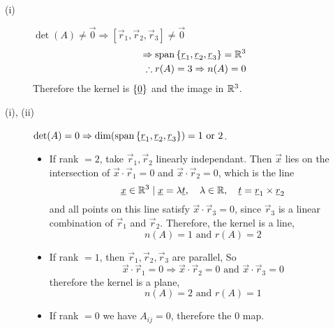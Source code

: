 \documentclass{article}
\numberwithin{equation}{section}
\begin{document}
\begin{description}
    \item[(i)] $\det(A) \neq \vec 0 \Rightarrow [\vec r_1, \vec r_2, \vec r_3] \neq \vec 0$
    \begin{align*}
        \Rightarrow \operatorname{span} \left\{ \underline{r}_1, \underline{r}_2, \underline{r}_3 \right\} = \mathbb{R}^3 \\
        \therefore r(A) = 3 \Rightarrow n(A) = 0
    \end{align*}
    Therefore the kernel is $\left\{ \underline{0} \right\}$ and the image in $\mathbb{R}^3$.

    \item[(i), (ii)] $\det(A) = 0 \Rightarrow \dim(\operatorname{span} \left\{ \underline{r}_1, \underline{r}_2, \underline{r}_3 \right\}) = 1 \text{ or } 2$.
    \begin{itemize}
        \item If rank $=2$, take $\vec r_1, \vec r_2$ linearly independant. 
        Then $\vec x$ lies on the intersection of $\vec x \cdot \vec r_1 = 0$ and $\vec x \cdot \vec r_2 = 0$, which is the line
        \[
            \underline{x} \in \mathbb{R}^3 \mid \underline{x} = \lambda \underline{t}, \quad \lambda \in \mathbb{R}, \quad \underline{t} = \underline{r}_1 \times \underline{r}_2
        \]
        and all points on this line satisfy $\vec x \cdot \vec r_3 = 0$, since $\vec r_3$ is a linear combination of $\vec r_1$ and $\vec r_2$.
        Therefore, the kernel is a line,
        \[
            n(A) = 1 \text{ and } r(A) = 2  
        \]

        \item If rank $=1$, then $\vec r_1, \vec r_2, \vec r_3$ are parallel, So
        \[
            \vec x \cdot \vec r_1 = 0 \Rightarrow \vec x \cdot \vec r_2 = 0 \text{ and } \vec x \cdot \vec r_3 = 0   
        \]
        therefore the kernel is a plane,
        \[
            n(A) = 2 \text{ and } r(A) = 1
        \]

        \item If rank $=0$ we have $A_{ij} = 0$, therefore the $0$ map.
    \end{itemize}
\end{description}
\end{document}
